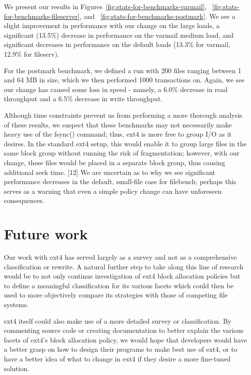 \documentclass{acm_proc_article-sp}
\begin{document}
We present our results in Figures~\ref{fig:stats-for-benchmarks-varmail}, ~\ref{fig:stats-for-benchmarks-fileserver}, and ~\ref{fig:stats-for-benchmarks-postmark}.  We see a slight improvement in performance with our change on the large loads, a significant (13.5\%) decrease in performance on the varmail medium load, and significant decreases in performance on the default loads (13.3\% for varmail, 12.9\% for fileserv). 
 
For the postmark benchmark, we defined a run with 200 files ranging between 1 and 64 MB in size, which we then performed 1000 transactions on.  Again, we see our change has caused some loss in speed - namely, a 6.0\% decrease in read throughput and a 6.5\% decrease in write throughput.
 
Although time constraints prevent us from performing a more thorough analysis of these results, we suspect that these benchmarks may not necessarily make heavy use of the fsync() command; thus, ext4 is more free to group I/O as it desires.  In the standard ext4 setup, this would enable it to group large files in the same block group without running the risk of fragmentation; however, with our change, these files would be placed in a separate block group, thus causing additional seek time. [12]  We are uncertain as to why we see significant performance decreases in the default, small-file case for filebench; perhaps this serves as a warning that even a simple policy change can have unforeseen consequences.



\section{Future work}
\label{sec:Future-work}
Our work with ext4 has served largely as a survey and not as a comprehensive classification or rewrite.  A natural further step to take along this line of research would be to not only continue investigation of ext4 block allocation policies but to define a meaningful classification for its various facets which could then be used to more objectively compare its strategies with those of competing file systems.
 
ext4 itself could also make use of a more detailed survey or classification.  By commenting source code or creating documentation to better explain the various facets of ext4's block allocation policy, we would hope that developers would have a better grasp on how to design their programs to make best use of ext4, or to have a better idea of what to change in ext4 if they desire a more fine-tuned solution.
 
\end{document}
